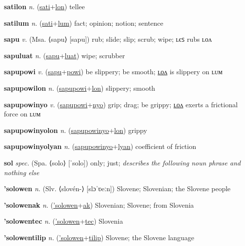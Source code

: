 \textbf{\hypertarget{satilon}{satilon}} \textit{n.} (\hyperlink{sati}{sati}+\allowbreak \hyperlink{lon}{lon})
tellee

\textbf{\hypertarget{satilum}{satilum}} \textit{n.} (\hyperlink{sati}{sati}+\allowbreak \hyperlink{lum}{lum})
fact; opinion; notion; sentence

\textbf{\hypertarget{sapu}{sapu}} \textit{v.} (Msa. ⟨sapu⟩ [sapu])
rub; slide; slip; scrub; wipe; ʟєꜱ rubs ʟᴏᴧ

\textbf{\hypertarget{sapuluat}{sapuluat}} \textit{n.} (\hyperlink{sapu}{sapu}+\allowbreak \hyperlink{luat}{luat})
wipe; scrubber

\textbf{\hypertarget{sapupowi}{sapupowi}} \textit{v.} (\hyperlink{sapu}{sapu}+\allowbreak \hyperlink{powi}{powi})
be slippery; be smooth; \hyperlink{sapupowilon}{ʟᴏᴧ} is slippery on ʟᴜᴍ

\textbf{\hypertarget{sapupowilon}{sapupowilon}} \textit{n.} (\hyperlink{sapupowi}{sapupowi}+\allowbreak \hyperlink{lon}{lon})
slippery; smooth

\textbf{\hypertarget{sapupowinyo}{sapupowinyo}} \textit{v.} (\hyperlink{sapupowi}{sapupowi}+\allowbreak \hyperlink{nyo}{nyo})
grip; drag; be grippy; \hyperlink{sapupowinyolon}{ʟᴏᴧ} exerts a frictional force on ʟᴜᴍ

\textbf{\hypertarget{sapupowinyolon}{sapupowinyolon}} \textit{n.} (\hyperlink{sapupowinyo}{sapupowinyo}+\allowbreak \hyperlink{lon}{lon})
grippy

\textbf{\hypertarget{sapupowinyolyan}{sapupowinyolyan}} \textit{n.} (\hyperlink{sapupowinyo}{sapupowinyo}+\allowbreak \hyperlink{lyan}{lyan})
coefficient of friction

\textbf{\hypertarget{sol}{sol}} \textit{spec.} (Spa. ⟨solo⟩ [ˈsolo])
only; just; \textit{describes the following noun phrase and nothing else}

\textbf{\hypertarget{'solowen}{'solowen}} \textit{n.} (Slv. ⟨slovén-⟩ [slɔˈʋeːn])
Slovene; Slovenian; the Slovene people

\textbf{\hypertarget{'solowenak}{'solowenak}} \textit{n.} (\hyperlink{'solowen}{'solowen}+\allowbreak \hyperlink{ak}{ak})
Slovenian; Slovene; from Slovenia

\textbf{\hypertarget{'solowentec}{'solowentec}} \textit{n.} (\hyperlink{'solowen}{'solowen}+\allowbreak \hyperlink{tec}{tec})
Slovenia

\textbf{\hypertarget{'solowentilip}{'solowentilip}} \textit{n.} (\hyperlink{'solowen}{'solowen}+\allowbreak \hyperlink{tilip}{tilip})
Slovene; the Slovene language

